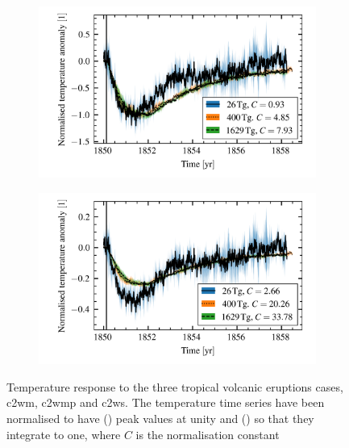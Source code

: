 \documentclass{ametsocV5}
\begin{document}
\begin{figure}
  \begin{subfigure}{\linewidth}
    \centering
    \includegraphics[width=0.95\linewidth]{figures/compare-waveform-max}
    \caption{}%
    \label{fig:compare-waveform-max}
  \end{subfigure}
  \begin{subfigure}{\linewidth}
    \centering
    \includegraphics[width=0.95\linewidth]{figures/compare-waveform-integrate}
    \caption{}%
    \label{fig:compare-waveform-integrate}
  \end{subfigure}

  \caption{Temperature response to the three tropical volcanic eruptions cases, \ac{c2wm},
    \ac{c2wmp} and \ac{c2ws}. The temperature time series have been normalised to have
    () peak values at unity and
    () so that they integrate to one, where \(C\) is
    the normalisation constant}\label{fig:compare-waveform}%
\end{figure}
\end{document}
